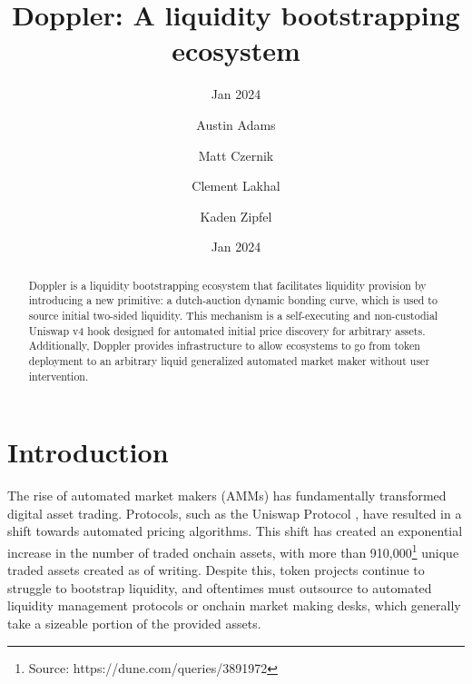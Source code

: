 \documentclass[sigconf,nonacm,prologue,table]{acmart}
\numberwithin{equation}{section}
\theoremstyle{definition}
\theoremstyle{remark}
\begin{document}
\title{Doppler: A liquidity bootstrapping ecosystem}
\subtitle{Jan 2024}
\date{Jan 2024}

\author{Austin Adams}
\affiliation{}

\author{Matt Czernik}
\affiliation{}

\author{Clement Lakhal}
\affiliation{}

\author{Kaden Zipfel}
\affiliation{}

\begin{teaserfigure}
\caption*{
    \hspace{\textwidth}
    }
\end{teaserfigure}

\renewcommand{\shortauthors}{Adams}

\begin{abstract}
Doppler is a liquidity bootstrapping ecosystem that facilitates liquidity provision by introducing a new primitive: a dutch-auction dynamic bonding curve, which is used to source initial two-sided liquidity. This mechanism is a self-executing and non-custodial Uniswap v4 hook designed for automated initial price discovery for arbitrary assets. Additionally, Doppler provides infrastructure to allow ecosystems to go from token deployment to an arbitrary liquid generalized automated market maker without user intervention.
\end{abstract}

\maketitle

\section{Introduction} \label{sec:introduction}
The rise of automated market makers (AMMs) has fundamentally transformed digital asset trading. Protocols, such as the Uniswap Protocol \cite{Adams21}, have resulted in a shift towards automated pricing algorithms. This shift has created an exponential increase in the number of traded onchain assets, with more than 910,000\footnote{Source: https://dune.com/queries/3891972} unique traded assets created as of writing. Despite this, token projects continue to struggle to bootstrap liquidity, and oftentimes must outsource to automated liquidity management protocols or onchain market making desks, which generally take a sizeable portion of the provided assets. 
\end{document}
